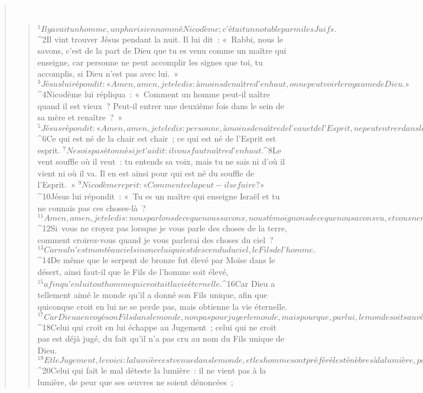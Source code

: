 \begin{verse}
         
      \bchapter{}
      \begin{verse}
${}^{1}Il y avait un homme, un pharisien nommé Nicodème ; c’était un notable parmi les Juifs. 
${}^{2}Il vint trouver Jésus pendant la nuit. Il lui dit : « Rabbi, nous le savons, c’est de la part de Dieu que tu es venu comme un maître qui enseigne, car personne ne peut accomplir les signes que toi, tu accomplis, si Dieu n’est pas avec lui. » 
${}^{3}Jésus lui répondit : « Amen, amen, je te le dis : à moins de naître d’en haut, on ne peut voir le royaume de Dieu. » 
${}^{4}Nicodème lui répliqua : « Comment un homme peut-il naître quand il est vieux ? Peut-il entrer une deuxième fois dans le sein de sa mère et renaître ? » 
${}^{5}Jésus répondit : « Amen, amen, je te le dis : personne, à moins de naître de l’eau et de l’Esprit, ne peut entrer dans le royaume de Dieu. 
${}^{6}Ce qui est né de la chair est chair ; ce qui est né de l’Esprit est esprit. 
${}^{7}Ne sois pas étonné si je t’ai dit : il vous faut naître d’en haut. 
${}^{8}Le vent souffle où il veut : tu entends sa voix, mais tu ne sais ni d’où il vient ni où il va. Il en est ainsi pour qui est né du souffle de l’Esprit. » 
${}^{9}Nicodème reprit : « Comment cela peut-il se faire ? » 
${}^{10}Jésus lui répondit : « Tu es un maître qui enseigne Israël et tu ne connais pas ces choses-là ?
${}^{11}Amen, amen, je te le dis : nous parlons de ce que nous savons, nous témoignons de ce que nous avons vu, et vous ne recevez pas notre témoignage. 
${}^{12}Si vous ne croyez pas lorsque je vous parle des choses de la terre, comment croirez-vous quand je vous parlerai des choses du ciel ? 
${}^{13}Car nul n’est monté au ciel sinon celui qui est descendu du ciel, le Fils de l’homme. 
${}^{14}De même que le serpent de bronze fut élevé par Moïse dans le désert, ainsi faut-il que le Fils de l’homme soit élevé, 
${}^{15}afin qu’en lui tout homme qui croit ait la vie éternelle.
${}^{16}Car Dieu a tellement aimé le monde qu’il a donné son Fils unique, afin que quiconque croit en lui ne se perde pas, mais obtienne la vie éternelle. 
${}^{17}Car Dieu a envoyé son Fils dans le monde, non pas pour juger le monde, mais pour que, par lui, le monde soit sauvé. 
${}^{18}Celui qui croit en lui échappe au Jugement ; celui qui ne croit pas est déjà jugé, du fait qu’il n’a pas cru au nom du Fils unique de Dieu. 
${}^{19}Et le Jugement, le voici : la lumière est venue dans le monde, et les hommes ont préféré les ténèbres à la lumière, parce que leurs œuvres étaient mauvaises. 
${}^{20}Celui qui fait le mal déteste la lumière : il ne vient pas à la lumière, de peur que ses œuvres ne soient dénoncées ; 

\end{verse}
\end{verse}
